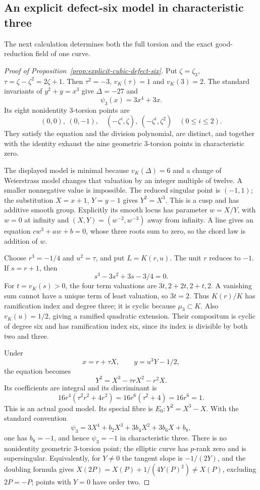 \subsection{An explicit defect-six model in characteristic three}
The next calculation determines both the full torsion and the exact good-reduction field of one curve.

\begin{proof}[Proof of Proposition~\ref{prop:explicit-cubic-defect-six}]
Put $\zeta=\zeta_3$, $\tau=\zeta-\zeta^2=2\zeta+1$. Then $\tau^2=-3$, $v_K(\tau)=1$ and $v_K(3)=2$. The standard invariants of $y^2+y=x^3$ give $\Delta=-27$ and
\[
                      \psi_3(x)=3x^4+3x.
\]
Its eight nonidentity $3$-torsion points are
\[
 (0,0),\ (0,-1),\quad
 (-\zeta^i,\zeta),\ (-\zeta^i,\zeta^2)\quad(0\le i\le2).
\]
They satisfy the equation and the division polynomial, are distinct, and together with the identity exhaust the nine geometric $3$-torsion points in characteristic zero.

The displayed model is minimal because $v_K(\Delta)=6$ and a change of Weierstrass model changes that valuation by an integer multiple of twelve. A smaller nonnegative value is impossible. The reduced singular point is $(-1,1)$; the substitution $X=x+1$, $Y=y-1$ gives $Y^2=X^3$. This is a cusp and has additive smooth group. Explicitly its smooth locus has parameter $w=X/Y$, with $w=0$ at infinity and $(X,Y)=(w^{-2},w^{-3})$ away from infinity. A line gives an equation $cw^3+aw+b=0$, whose three roots sum to zero, so the chord law is addition of $w$.

Choose $r^3=-1/4$ and $u^2=\tau$, and put $L=K(r,u)$. The unit $r$ reduces to $-1$. If $s=r+1$, then
\[
                     s^3-3s^2+3s-3/4=0.
\]
For $t=v_K(s)>0$, the four term valuations are $3t,2+2t,2+t,2$. A vanishing sum cannot have a unique term of least valuation, so $3t=2$. Thus $K(r)/K$ has ramification index and degree three; it is cyclic because $\mu_3\subset K$. Also $v_K(u)=1/2$, giving a ramified quadratic extension. Their compositum is cyclic of degree six and has ramification index six, since its index is divisible by both two and three.

Under
\[
                    x=r+\tau X,\qquad y=u^3Y-1/2,
\]
the equation becomes
\begin{equation}\label{eq:explicit-cubic-good-model}
                      Y^2=X^3-\tau rX^2-r^2X.
\end{equation}
Its coefficients are integral and its discriminant is
\[
 16r^4(\tau^2r^2+4r^2)=16r^6(\tau^2+4)=16r^6=1.
\]
This is an actual good model. Its special fibre is $E_0:Y^2=X^3-X$. With the standard convention
\[
 \psi_3=3X^4+b_2X^3+3b_4X^2+3b_6X+b_8,
\]
one has $b_8=-1$, and hence $\psi_3=-1$ in characteristic three. There is no nonidentity geometric $3$-torsion point; the elliptic curve has $p$-rank zero and is supersingular. Equivalently, for $Y\ne0$ the tangent slope is $-1/(2Y)$, and the doubling formula gives $X(2P)=X(P)+1/(4Y(P)^2)\ne X(P)$, excluding $2P=-P$; points with $Y=0$ have order two.


\end{proof}
